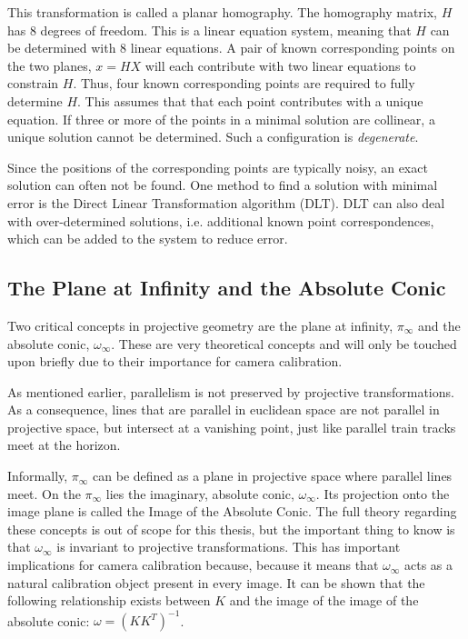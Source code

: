 This transformation is called a planar homography. The homography matrix, $H$ has 8 degrees of freedom. 
This is a linear equation system, meaning that $H$ can be determined with 8 linear equations.
A pair of known corresponding points on the two planes, $x=HX$ will each contribute with two linear equations to constrain $H$.
Thus, four known corresponding points are required to fully determine $H$.
This assumes that that each point contributes with a unique equation.
If three or more of the points in a minimal solution are collinear, a unique solution cannot be determined.
Such a configuration is \textit{degenerate}. \cite[91-92]{hartley-zisserman}

Since the positions of the corresponding points are typically noisy, an exact solution can often not be found.
One method to find a solution with minimal error is the Direct Linear Transformation algorithm (DLT). DLT can also deal with over-determined solutions, i.e. additional known point correspondences, which can be added to the system to reduce error. \cite{homography-estimation}

\subsection{The Plane at Infinity and the Absolute Conic} \label{ac}
Two critical concepts in projective geometry are the plane at infinity, $\pi_{\infty}$ and the absolute conic, $\omega_{\infty}$.
These are very theoretical concepts and will only be touched upon briefly due to their importance for camera calibration.

As mentioned earlier, parallelism is not preserved by projective transformations. %
As a consequence, lines that are parallel in euclidean space are not parallel in projective space, but intersect at a vanishing point, just like parallel train tracks meet at the horizon.

Informally, $\pi_{\infty}$ can be defined as a plane in projective space where parallel lines meet. 
On the $\pi_{\infty}$ lies the imaginary, absolute conic, $\omega_{\infty}$.
Its projection onto the image plane is called the Image of the Absolute Conic.
The full theory regarding these concepts is out of scope for this thesis, but the important thing to know is that $\omega_{\infty}$ is invariant to projective transformations.
This has important implications for camera calibration because, because it means that $\omega_{\infty}$ acts as a natural calibration object present in every image.
It can be shown that the following relationship exists between $K$ and the image of the image of the absolute conic:
$\omega = (KK^T)^{-1}$. \cite[210]{hartley-zisserman}\cite{pollefeys}


